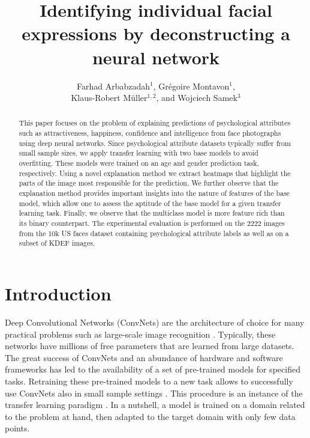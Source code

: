 \documentclass[runningheads]{llncs}
\begin{document}
\pagestyle{headings}
\mainmatter
\def\GCPR16SubNumber{85}
\title{Identifying individual facial expressions by deconstructing a neural network}
\author{Farhad Arbabzadah$^1$, Gr{\'e}goire Montavon$^1$,\\ Klaus-Robert M{\"u}ller$^{1,2}$, and Wojciech Samek$^3$}
\maketitle

\begin{abstract}
This paper focuses on the problem of explaining predictions of psychological attributes such as attractiveness, happiness, confidence and intelligence from face photographs using deep neural networks. Since psychological attribute datasets typically suffer from small sample sizes, we apply transfer learning with two base models to avoid overfitting. These models were trained on an age and gender prediction task, respectively. Using a novel explanation method we extract heatmaps that highlight the parts of the image most responsible for the prediction. We further observe that the explanation method provides important insights into the nature of features of the base model, which allow one to assess the aptitude of the base model for a given transfer learning task. Finally, we observe that the multiclass model is more feature rich than its binary counterpart. The experimental evaluation is performed on the 2222 images from the 10k US faces dataset containing psychological attribute labels as well as on a subset of KDEF images.
\end{abstract}
\section{Introduction}
Deep Convolutional Networks (ConvNets) \cite{le1990handwritten} are the architecture of choice for many practical problems such as large-scale image recognition \cite{krizhevsky2012imagenet,he2015deep}. Typically, these networks have millions of free parameters that are learned from large datasets. The great success of ConvNets and an abundance of hardware and software frameworks \cite{jia2014caffe} has led to the availability of a set of pre-trained models for specified tasks. Retraining these pre-trained models to a new task allows to successfully use ConvNets also in small sample settings \cite{yosinski2014transferable,donahue2013decaf}. This procedure is an instance of the transfer learning paradigm \cite{caruana1997multitask}. In a nutshell, a model is trained on a domain related to the problem at hand, then adapted to the target domain with only few data points.
\end{document}
